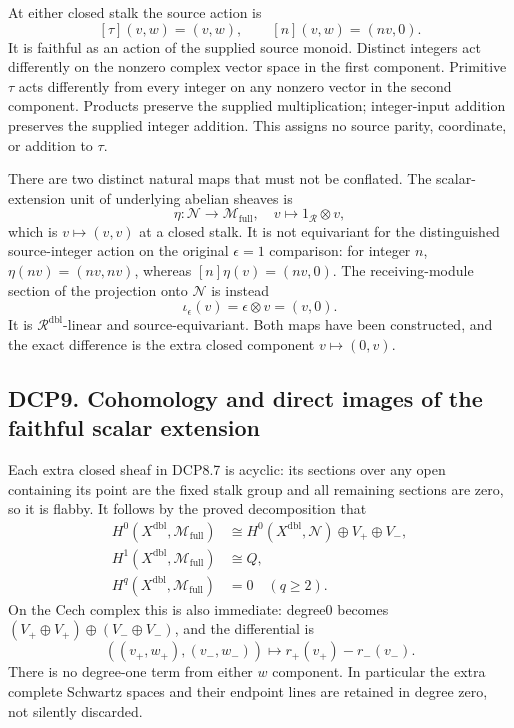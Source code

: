 At either closed stalk the source action is \[
 [\tau](v,w)=(v,w),\qquad [n](v,w)=(nv,0).
\tag{DCP8.8}
\] It is faithful as an action of the supplied source monoid. Distinct
integers act differently on the nonzero complex vector space in the
first component. Primitive \(\tau\) acts differently from every integer
on any nonzero vector in the second component. Products preserve the
supplied multiplication; integer-input addition preserves the supplied
integer addition. This assigns no source parity, coordinate, or addition
to \(\tau\).

There are two distinct natural maps that must not be conflated. The
scalar-extension unit of underlying abelian sheaves is \[
 \eta:\mathcal N\to\mathcal M_{\mathrm{full}},\quad v\mapsto1_{\mathcal R}\otimes v,
\] which is \(v\mapsto(v,v)\) at a closed stalk. It is not equivariant
for the distinguished source-integer action on the original
\(\epsilon=1\) comparison: for integer \(n\), \(\eta(nv)=(nv,nv)\),
whereas \([n]\eta(v)=(nv,0)\). The receiving-module section of the
projection onto \(\mathcal N\) is instead \[
 \iota_\epsilon(v)=\epsilon\otimes v=(v,0).
\tag{DCP8.9}
\] It is \(\mathcal R^{\mathrm{dbl}}\)-linear and source-equivariant.
Both maps have been constructed, and the exact difference is the extra
closed component \(v\mapsto(0,v)\).

\subsection{DCP9. Cohomology and direct images of the faithful scalar
extension}\label{dcp9.-cohomology-and-direct-images-of-the-faithful-scalar-extension}

Each extra closed sheaf in DCP8.7 is acyclic: its sections over any open
containing its point are the fixed stalk group and all remaining
sections are zero, so it is flabby. It follows by the proved
decomposition that \[
\begin{aligned}
 H^0(X^{\mathrm{dbl}},\mathcal M_{\mathrm{full}})
 &\cong H^0(X^{\mathrm{dbl}},\mathcal N)\oplus V_+\oplus V_-,\\
 H^1(X^{\mathrm{dbl}},\mathcal M_{\mathrm{full}})&\cong Q,\\
 H^q(X^{\mathrm{dbl}},\mathcal M_{\mathrm{full}})&=0\quad(q\ge2).
\end{aligned}
\tag{DCP9.1}
\] On the Cech complex this is also immediate: degree0 becomes
\((V_+\oplus V_+)\oplus(V_-\oplus V_-)\), and the differential is \[
 ((v_+,w_+),(v_-,w_-))
 \longmapsto r_+(v_+)-r_-(v_-).
\tag{DCP9.2}
\] There is no degree-one term from either \(w\) component. In
particular the extra complete Schwartz spaces and their endpoint lines
are retained in degree zero, not silently discarded.

